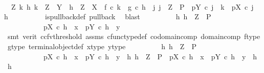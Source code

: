 \begin{isabellebody}
\ \ \ \ \ \ \isamarkupfalse%
\ \ {\isachardoublequoteopen}{\isasymAnd}Z\ k\ h{\isachardot}{\kern0pt}\ k\ {\isacharcolon}{\kern0pt}\ Z\ {\isasymrightarrow}\ Y\ {\isasymLongrightarrow}\ h\ {\isacharcolon}{\kern0pt}\ Z\ {\isasymrightarrow}\ X\ {\isasymLongrightarrow}\ f\ {\isasymcirc}\isactrlsub c\ k\ {\isacharequal}{\kern0pt}\ g\ {\isasymcirc}\isactrlsub c\ h\ {\isasymLongrightarrow}\ {\isasymexists}j{\isachardot}{\kern0pt}\ j\ {\isacharcolon}{\kern0pt}\ Z\ {\isasymrightarrow}\ P\ {\isasymand}\ pY\ {\isasymcirc}\isactrlsub c\ j\ {\isacharequal}{\kern0pt}\ k\ {\isasymand}\ pX\ {\isasymcirc}\isactrlsub c\ j\ {\isacharequal}{\kern0pt}\ h{\isachardoublequoteclose}\isanewline
\ \ \ \ \ \ \ \ \isamarkupfalse%
\ is{\isacharunderscore}{\kern0pt}pullback{\isacharunderscore}{\kern0pt}def\ pullback\ \isamarkupfalse%
\ blast\isanewline
\ \ \ \ \ \ \isamarkupfalse%
\ \isamarkupfalse%
\ {\isachardoublequoteopen}{\isasymexists}h{\isachardot}{\kern0pt}\ h\ {\isacharcolon}{\kern0pt}\ Z\ {\isasymrightarrow}\ P\ {\isasymand}\isanewline
\ \ \ \ \ \ \ \ \ \ \ pX\ {\isasymcirc}\isactrlsub c\ h\ {\isacharequal}{\kern0pt}\ x\ {\isasymand}\ pY\ {\isasymcirc}\isactrlsub c\ h\ {\isacharequal}{\kern0pt}\ y{\isachardoublequoteclose}\isanewline
\ \ \ \ \ \ \ \ \isamarkupfalse%
\ {\isacharparenleft}{\kern0pt}smt\ {\isacharparenleft}{\kern0pt}verit{\isacharcomma}{\kern0pt}\ ccfv{\isacharunderscore}{\kern0pt}threshold{\isacharparenright}{\kern0pt}\ assms\ cfunc{\isacharunderscore}{\kern0pt}type{\isacharunderscore}{\kern0pt}def\ codomain{\isacharunderscore}{\kern0pt}comp\ domain{\isacharunderscore}{\kern0pt}comp\ f{\isacharunderscore}{\kern0pt}type\ g{\isacharunderscore}{\kern0pt}type\ terminal{\isacharunderscore}{\kern0pt}object{\isacharunderscore}{\kern0pt}def\ x{\isacharunderscore}{\kern0pt}type\ y{\isacharunderscore}{\kern0pt}type{\isacharparenright}{\kern0pt}\isanewline
\ \ \ \ \ \ \isamarkupfalse%
\ \isamarkupfalse%
\ {\isachardoublequoteopen}{\isasymexists}h{\isachardot}{\kern0pt}\ h\ {\isacharcolon}{\kern0pt}\ Z\ {\isasymrightarrow}\ P\ {\isasymand}\isanewline
\ \ \ \ \ \ \ \ \ \ \ pX\ {\isasymcirc}\isactrlsub c\ h\ {\isacharequal}{\kern0pt}\ x\ {\isasymand}\ pY\ {\isasymcirc}\isactrlsub c\ h\ {\isacharequal}{\kern0pt}\ y\ {\isasymand}\ {\isacharparenleft}{\kern0pt}{\isasymforall}h{}{\isachardot}{\kern0pt}\ h{}\ {\isacharcolon}{\kern0pt}\ Z\ {\isasymrightarrow}\ P\ {\isasymand}\ pX\ {\isasymcirc}\isactrlsub c\ h{}\ {\isacharequal}{\kern0pt}\ x\ {\isasymand}\ pY\ {\isasymcirc}\isactrlsub c\ h{}\ {\isacharequal}{\kern0pt}\ y\ {\isasymlongrightarrow}\ h{}\ {\isacharequal}{\kern0pt}\ h{\isacharparenright}{\kern0pt}{\isachardoublequoteclose}\isanewline

\end{isabellebody}

